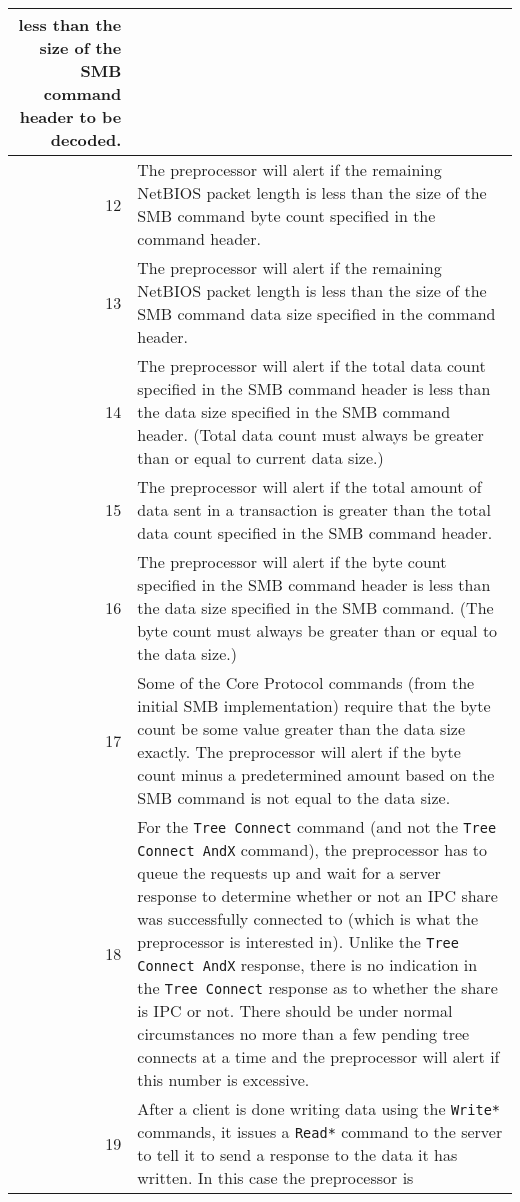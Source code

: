 \documentclass[english]{report}
\begin{document}
\begin{itemize}
\begin{longtable}{|r|p{13.5cm}|}
      less than the size of the SMB command header to be decoded.\\
\hline
 12 & The preprocessor will alert if the remaining NetBIOS packet length is
      less than the size of the SMB command byte count specified in the
      command header.\\
\hline
 13 & The preprocessor will alert if the remaining NetBIOS packet length is
      less than the size of the SMB command data size specified in the command
      header.\\
\hline
 14 & The preprocessor will alert if the total data count specified in the
      SMB command header is less than the data size specified in the SMB
      command header. (Total data count must always be greater than or equal
      to current data size.)\\
\hline
 15 & The preprocessor will alert if the total amount of data sent in a
      transaction is greater than the total data count specified in the SMB
      command header.\\
\hline
 16 & The preprocessor will alert if the byte count specified in the SMB
      command header is less than the data size specified in the SMB command.
      (The byte count must always be greater than or equal to the data size.)\\
\hline
 17 & Some of the Core Protocol commands (from the initial SMB implementation)
      require that the byte count be some value greater than the data size
      exactly. The preprocessor will alert if the byte count minus a
      predetermined amount based on the SMB command is not equal to the data
      size.\\
\hline
 18 & For the \texttt{Tree Connect} command (and not the
      \texttt{Tree Connect AndX} command), the preprocessor has to queue
      the requests up and wait for a server response to determine whether or
      not an IPC share was successfully connected to (which is what the
      preprocessor is interested in). Unlike the \texttt{Tree Connect AndX}
      response, there is no indication in the \texttt{Tree Connect} response
      as to whether the share is IPC or not. There should be under normal
      circumstances no more than a few pending tree connects at a time and
      the preprocessor will alert if this number is excessive.\\
\hline
 19 & After a client is done writing data using the \texttt{Write*} commands,
      it issues a \texttt{Read*} command to the server to tell it to send a
      response to the data it has written. In this case the preprocessor is

\end{longtable}
\end{itemize}
\end{document}
